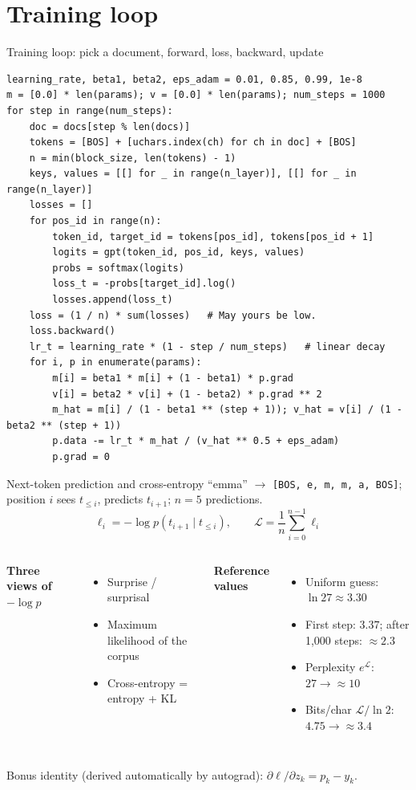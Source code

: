 \documentclass[aspectratio=169,11pt]{beamer}
\begin{document}
\section{Training loop}
\begin{frame}[fragile]{Training loop: pick a document, forward, loss, backward, update}
\vspace{-4pt}
\begin{lstlisting}[basicstyle=\ttfamily\tiny]
learning_rate, beta1, beta2, eps_adam = 0.01, 0.85, 0.99, 1e-8
m = [0.0] * len(params); v = [0.0] * len(params); num_steps = 1000
for step in range(num_steps):
    doc = docs[step % len(docs)]
    tokens = [BOS] + [uchars.index(ch) for ch in doc] + [BOS]
    n = min(block_size, len(tokens) - 1)
    keys, values = [[] for _ in range(n_layer)], [[] for _ in range(n_layer)]
    losses = []
    for pos_id in range(n):
        token_id, target_id = tokens[pos_id], tokens[pos_id + 1]
        logits = gpt(token_id, pos_id, keys, values)
        probs = softmax(logits)
        loss_t = -probs[target_id].log()
        losses.append(loss_t)
    loss = (1 / n) * sum(losses)   # May yours be low.
    loss.backward()
    lr_t = learning_rate * (1 - step / num_steps)   # linear decay
    for i, p in enumerate(params):
        m[i] = beta1 * m[i] + (1 - beta1) * p.grad
        v[i] = beta2 * v[i] + (1 - beta2) * p.grad ** 2
        m_hat = m[i] / (1 - beta1 ** (step + 1)); v_hat = v[i] / (1 - beta2 ** (step + 1))
        p.data -= lr_t * m_hat / (v_hat ** 0.5 + eps_adam)
        p.grad = 0
\end{lstlisting}
\end{frame}

\begin{frame}{Next-token prediction and cross-entropy}
``emma'' $\to$ \texttt{[BOS, e, m, m, a, BOS]}; position $i$ sees $t_{\le i}$, predicts $t_{i+1}$; $n=5$ predictions.
\[
\ell_i = -\log p(t_{i+1}\mid t_{\le i}),\qquad \mathcal L = \frac1n\sum_{i=0}^{n-1}\ell_i
\]
\begin{columns}
\textbf{Three views of $-\log p$}
\begin{itemize}
  \item Surprise / surprisal \parencite{shannon1948mathematical}
  \item Maximum likelihood of the corpus
  \item Cross-entropy = entropy + KL \parencite{goodfellow2016deep}
\end{itemize}
\textbf{Reference values}
\begin{itemize}
  \item Uniform guess: $\ln 27 \approx 3.30$
  \item First step: $3.37$; after 1{,}000 steps: $\approx 2.3$
  \item Perplexity $e^{\mathcal L}$: $27 \to \approx 10$
  \item Bits/char $\mathcal L/\ln 2$: $4.75 \to \approx 3.4$
\end{itemize}
\end{columns}
\vfill
Bonus identity (derived automatically by autograd): $\partial\ell/\partial z_k = p_k - y_k$.
\end{frame}
\end{document}
